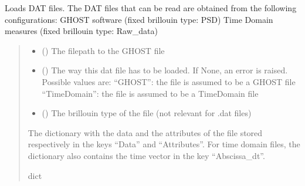 \documentclass[letterpaper,10pt,english]{sphinxmanual}
\begin{document}
\begin{fulllineitems}
\label{\detokenize{source/_autosummary/HDF5_BLS.load_data:HDF5_BLS.load_data.load_dat_file}}
\pysigstartsignatures
\pysiglinewithargsret
{}
{\sphinxparamcomma {}\sphinxparamcomma {}\sphinxparamcomma {}}
{}
\pysigstopsignatures
\sphinxAtStartPar
Loads DAT files. The DAT files that can be read are obtained from the following configurations:
\sphinxhyphen{} GHOST software (fixed brillouin type: PSD)
\sphinxhyphen{} Time Domain measures (fixed brillouin type: Raw\_data)
\begin{quote}\begin{description}
\begin{itemize}
\item {} 
\sphinxAtStartPar
{} () \textendash{} The filepath to the GHOST file

\item {} 
\sphinxAtStartPar
{} (\sphinxstyleliteralemphasis{\sphinxupquote{, }}) \textendash{} The way this dat file has to be loaded. If None, an error is raised. Possible values are:
\sphinxhyphen{} “GHOST”: the file is assumed to be a GHOST file
\sphinxhyphen{} “TimeDomain”: the file is assumed to be a TimeDomain file

\item {} 
\sphinxAtStartPar
{} (\sphinxstyleliteralemphasis{\sphinxupquote{, }}) \textendash{} The brillouin type of the file (not relevant for .dat files)

\end{itemize}

\sphinxAtStartPar
The dictionary with the data and the attributes of the file stored respectively in the keys “Data” and “Attributes”. For time domain files, the dictionary also contains the time vector in the key “Abscissa\_dt”.

\sphinxAtStartPar
dict

\end{description}\end{quote}

\end{fulllineitems}
\end{document}
